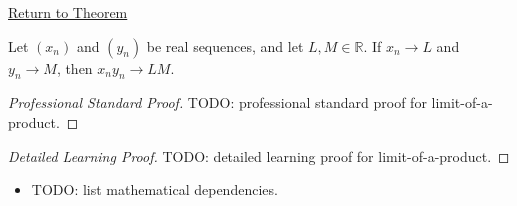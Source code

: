 \newpage
{}
\label{prf:limit-of-a-product}

\begin{remark*}[Return]
\hyperref[thm:limit-of-a-product]{Return to Theorem}
\end{remark*}

\begin{theorem*}
Let $(x_n)$ and $(y_n)$ be real sequences, and let $L,M\in\mathbb{R}$.
If $x_n\to L$ and $y_n\to M$, then $x_ny_n\to LM$.

\smallskip
\noindent
\end{theorem*}

\begin{proof}[Professional Standard Proof]
\LRAProofBodyStart
TODO: professional standard proof for limit-of-a-product.
\end{proof}

\begin{proof}[Detailed Learning Proof]
\LRAProofBodyStart
TODO: detailed learning proof for limit-of-a-product.
\end{proof}

\begin{remark*}
\end{remark*}

\begin{dependencies}
\begin{itemize}
  \item TODO: list mathematical dependencies.
\end{itemize}
\end{dependencies}

\clearpage
